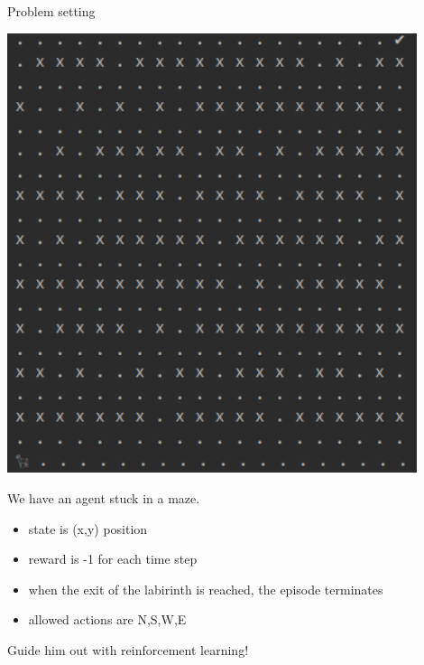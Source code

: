 \bgroup
\begin{frame}{Problem setting}
\begin{minipage}{0.5\textwidth}
\includegraphics[width=0.9\textwidth]{img/env.png}
\end{minipage}
\begin{minipage}{0.45\textwidth}
We have an agent stuck in a maze.
\begin{itemize}
\item state is (x,y) position
\item reward is -1 for each time step
\item when the exit of the labirinth is reached, the episode terminates
\item allowed actions are N,S,W,E
\end{itemize}
Guide him out with reinforcement learning!
\end{minipage}
\end{frame}
\egroup